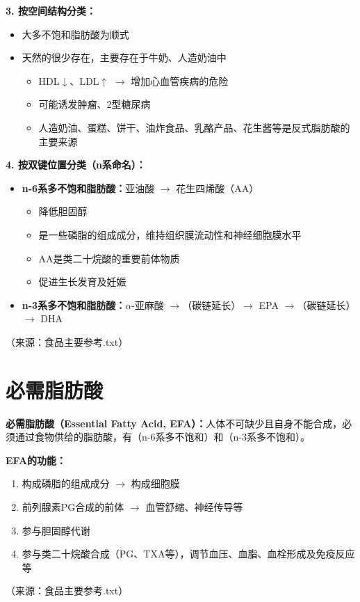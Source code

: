 \begin{keybox}
\textbf{3. 按空间结构分类：}
\begin{itemize}[leftmargin=*]
    \item {}大多不饱和脂肪酸为顺式
    \item {}天然的很少存在，主要存在于牛奶、人造奶油中
    \begin{itemize}
        \item HDL$\downarrow$、LDL$\uparrow$ $\rightarrow$ 增加心血管疾病的危险
        \item 可能诱发肿瘤、2型糖尿病
        \item 人造奶油、蛋糕、饼干、油炸食品、乳酪产品、花生酱等是反式脂肪酸的主要来源
    \end{itemize}
\end{itemize}

\textbf{4. 按双键位置分类（n系命名）：}
\begin{itemize}[leftmargin=*]
    \item \textbf{n-6系多不饱和脂肪酸：}亚油酸 $\rightarrow$ 花生四烯酸（AA）
    \begin{itemize}
        \item 降低胆固醇
        \item 是一些磷脂的组成成分，维持组织膜流动性和神经细胞膜水平
        \item AA是类二十烷酸的重要前体物质
        \item 促进生长发育及妊娠
    \end{itemize}
    \item \textbf{n-3系多不饱和脂肪酸：}$\alpha$-亚麻酸 $\rightarrow$（碳链延长）$\rightarrow$ EPA $\rightarrow$（碳链延长）$\rightarrow$ DHA
\end{itemize}
（来源：食品主要参考.txt）
\end{keybox}

\section{必需脂肪酸}

\begin{keybox}
\textbf{必需脂肪酸（Essential Fatty Acid, EFA）：}人体不可缺少且自身不能合成，必须通过食物供给的脂肪酸，有（n-6系多不饱和）和（n-3系多不饱和）。

\textbf{EFA的功能：}
\begin{enumerate}[leftmargin=*]
    \item 构成磷脂的组成成分 $\rightarrow$ 构成细胞膜
    \item 前列腺素PG合成的前体 $\rightarrow$ 血管舒缩、神经传导等
    \item 参与胆固醇代谢
    \item 参与类二十烷酸合成（PG、TXA等），调节血压、血脂、血栓形成及免疫反应等
\end{enumerate}
（来源：食品主要参考.txt）
\end{keybox}

